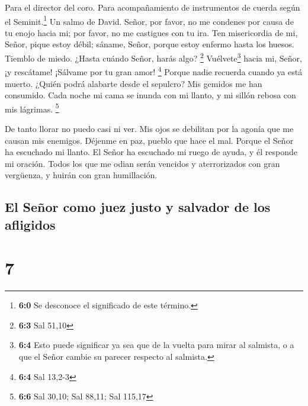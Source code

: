 Para el director del coro. Para acompañamiento de instrumentos de cuerda
según el Seminit.\footnote{\textbf{6:0} Se desconoce el significado de
  este término.} Un salmo de David.  Señor, por favor, no
me condenes por causa de tu enojo hacia mi; por favor, no me castigues
con tu ira.  Ten misericordia de mi, Señor, pique estoy
débil; sáname, Señor, porque estoy enfermo hasta los huesos.
 Tiemblo de miedo. ¿Hasta cuándo Señor, harás algo?
\footnote{\textbf{6:3} Sal 51,10}  Vuélvete\footnote{\textbf{6:4}
  Esto puede significar ya sea que de la vuelta para mirar al salmista,
  o a que el Señor cambie su parecer respecto al salmista.} hacia mi,
Señor, ¡y rescátame! ¡Sálvame por tu gran amor! \footnote{\textbf{6:4}
  Sal 13,2-3}  Porque nadie recuerda cuando ya está
muerto. ¿Quién podrá alabarte desde el sepulcro?  Mis
gemidos me han consumido. Cada noche mi cama se inunda con mi llanto, y
mi sillón rebosa con mis lágrimas. \footnote{\textbf{6:6} Sal 30,10; Sal
  88,11; Sal 115,17}

 De tanto llorar no puedo casi ni ver. Mis ojos se
debilitan por la agonía que me causan mis enemigos. 
Déjenme en paz, pueblo que hace el mal. Porque el Señor ha escuchado mi
llanto.  El Señor ha escuchado mi ruego de ayuda, y él
responde mi oración.  Todos los que me odian serán
vencidos y aterrorizados con gran vergüenza, y huirán con gran
humillación.

\hypertarget{el-seuxf1or-como-juez-justo-y-salvador-de-los-afligidos}{%
\subsection{El Señor como juez justo y salvador de los
afligidos}\label{el-seuxf1or-como-juez-justo-y-salvador-de-los-afligidos}}

\hypertarget{section-6}{%
\section{7}\label{section-6}}

